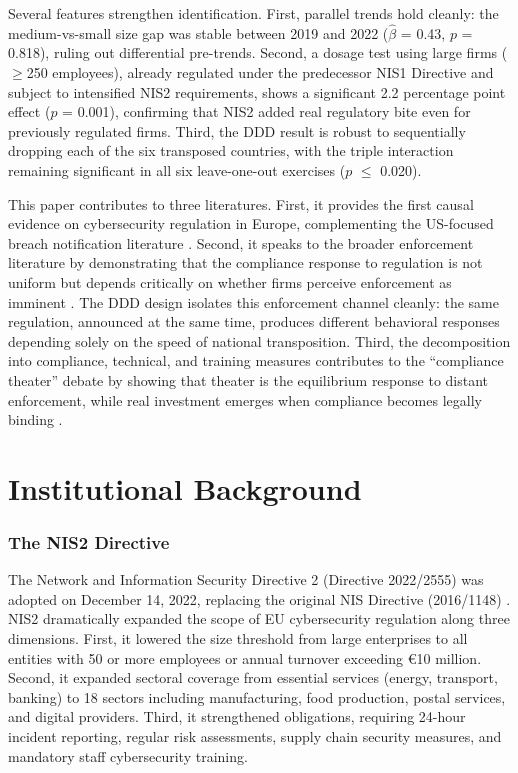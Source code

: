 \documentclass[12pt]{article}
\begin{document}
Several features strengthen identification. First, parallel trends hold cleanly: the medium-vs-small size gap was stable between 2019 and 2022 ($\hat{\beta}$ = 0.43, $p$ = 0.818), ruling out differential pre-trends. Second, a dosage test using large firms ($\geq$250 employees), already regulated under the predecessor NIS1 Directive and subject to intensified NIS2 requirements, shows a significant 2.2 percentage point effect ($p$ = 0.001), confirming that NIS2 added real regulatory bite even for previously regulated firms. Third, the DDD result is robust to sequentially dropping each of the six transposed countries, with the triple interaction remaining significant in all six leave-one-out exercises ($p$ $\leq$ 0.020).

This paper contributes to three literatures. First, it provides the first causal evidence on cybersecurity regulation in Europe, complementing the US-focused breach notification literature \citep{romanosky2011breach, johnson2020breach, laube2016economics}. Second, it speaks to the broader enforcement literature by demonstrating that the compliance response to regulation is not uniform but depends critically on whether firms perceive enforcement as imminent \citep{shimshack2014enforcement, duflo2013truth, gray2005effectiveness}. The DDD design isolates this enforcement channel cleanly: the same regulation, announced at the same time, produces different behavioral responses depending solely on the speed of national transposition. Third, the decomposition into compliance, technical, and training measures contributes to the ``compliance theater'' debate by showing that theater is the equilibrium response to distant enforcement, while real investment emerges when compliance becomes legally binding \citep{schneier2003beyond, anderson2001information}.

\section{Institutional Background}

\subsubsection*{The NIS2 Directive} The Network and Information Security Directive 2 (Directive 2022/2555) was adopted on December 14, 2022, replacing the original NIS Directive (2016/1148) \citep{eu2022nis2}. NIS2 dramatically expanded the scope of EU cybersecurity regulation along three dimensions. First, it lowered the size threshold from large enterprises to all entities with 50 or more employees or annual turnover exceeding \euro{}10 million. Second, it expanded sectoral coverage from essential services (energy, transport, banking) to 18 sectors including manufacturing, food production, postal services, and digital providers. Third, it strengthened obligations, requiring 24-hour incident reporting, regular risk assessments, supply chain security measures, and mandatory staff cybersecurity training.
\end{document}
